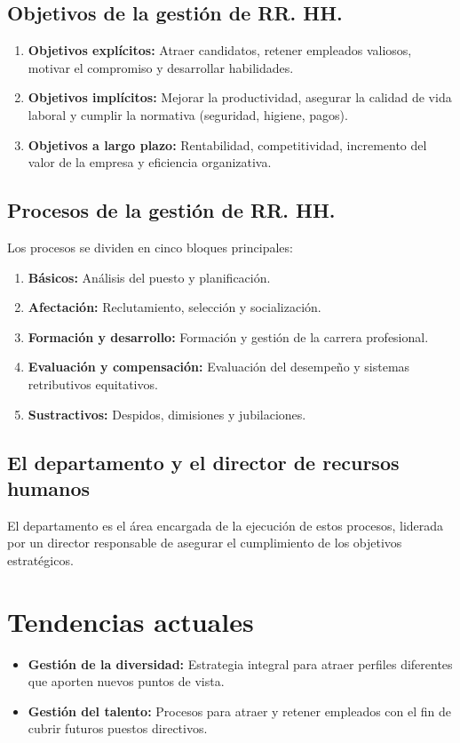 \subsection{Objetivos de la gestión de RR. HH.}
\begin{enumerate}
    \item \textbf{Objetivos explícitos:} Atraer candidatos, retener empleados valiosos, motivar el compromiso y desarrollar habilidades.
    \item \textbf{Objetivos implícitos:} Mejorar la productividad, asegurar la calidad de vida laboral y cumplir la normativa (seguridad, higiene, pagos).
    \item \textbf{Objetivos a largo plazo:} Rentabilidad, competitividad, incremento del valor de la empresa y eficiencia organizativa.
\end{enumerate}

\subsection{Procesos de la gestión de RR. HH.}
Los procesos se dividen en cinco bloques principales:
\begin{enumerate}
    \item \textbf{Básicos:} Análisis del puesto y planificación.
    \item \textbf{Afectación:} Reclutamiento, selección y socialización.
    \item \textbf{Formación y desarrollo:} Formación y gestión de la carrera profesional.
    \item \textbf{Evaluación y compensación:} Evaluación del desempeño y sistemas retributivos equitativos.
    \item \textbf{Sustractivos:} Despidos, dimisiones y jubilaciones.
\end{enumerate}

\subsection{El departamento y el director de recursos humanos}
El departamento es el área encargada de la ejecución de estos procesos, liderada por un director responsable de asegurar el cumplimiento de los objetivos estratégicos.

\section{Tendencias actuales}
\begin{itemize}
    \item \textbf{Gestión de la diversidad:} Estrategia integral para atraer perfiles diferentes que aporten nuevos puntos de vista.
    \item \textbf{Gestión del talento:} Procesos para atraer y retener empleados con el fin de cubrir futuros puestos directivos.
\end{itemize}
